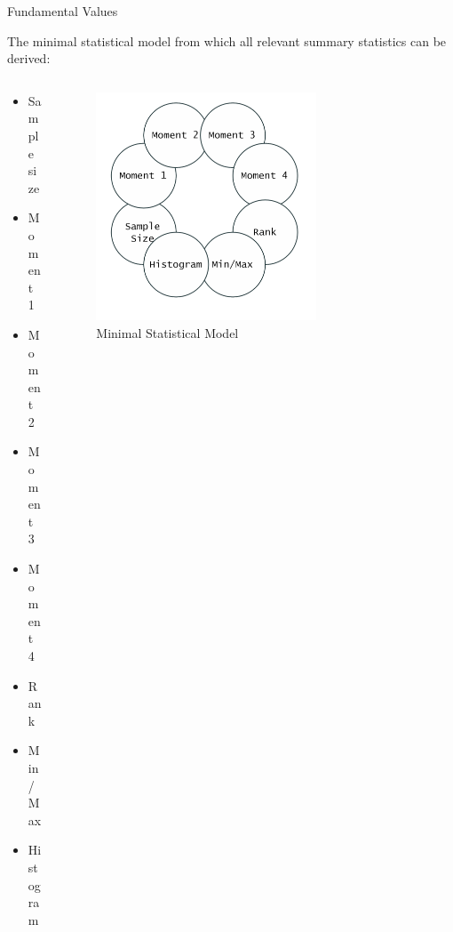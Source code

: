 \documentclass[10pt,aspectratio=169]{beamer} %
\begin{document}
\begin{frame}{Fundamental Values}

The minimal statistical model from which all relevant summary statistics can be derived:
\begin{columns}[c]
\begin{column}{0.4\textwidth}
\begin{itemize}
\item Sample size
\item Moment 1
\item Moment 2
\item Moment 3
\item Moment 4
\item Rank
\item Min/Max
\item Histogram
\end{itemize}
\end{column}
\begin{column}{0.6\textwidth}
\begin{figure}
    \includegraphics[width=0.68\textwidth]{fundamental.png}
    \caption{Minimal Statistical Model}
\end{figure}
\end{column}
\end{columns}
\end{frame}
\end{document}
